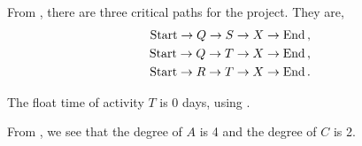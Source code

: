 \begin{subquestions}
\begin{subsubquestions}
From , there are three critical paths for the project. They are,
\begin{align}
	\text{Start} \rightarrow Q \rightarrow S \rightarrow X \rightarrow \text{End}\,, \nonumber \\
	\text{Start} \rightarrow Q \rightarrow T \rightarrow X \rightarrow \text{End}\,, \nonumber \\
	\text{Start} \rightarrow R \rightarrow T \rightarrow X \rightarrow \text{End}\,.
\end{align}


\subsubquestion

The float time of activity $T$ is 0 days, using .

\end{subsubquestions}


\subquestion

From , we see that the degree of $A$ is 4 and the degree of $C$ is 2.


\subquestion

\begin{subsubquestions}

\subsubquestion 


\end{subsubquestions}
\end{subquestions}
